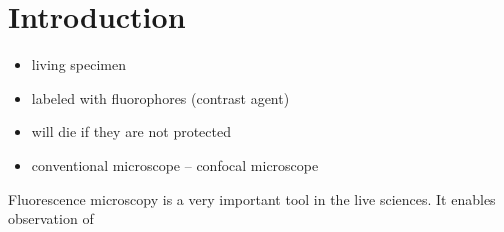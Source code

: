 \chapter{Introduction}
\begin{itemize}
\item living specimen
\item labeled with fluorophores (contrast agent)
\item will die if they are not protected
\item conventional microscope -- confocal microscope
\end{itemize}
Fluorescence microscopy is a very important tool in the live sciences.
It enables observation of
